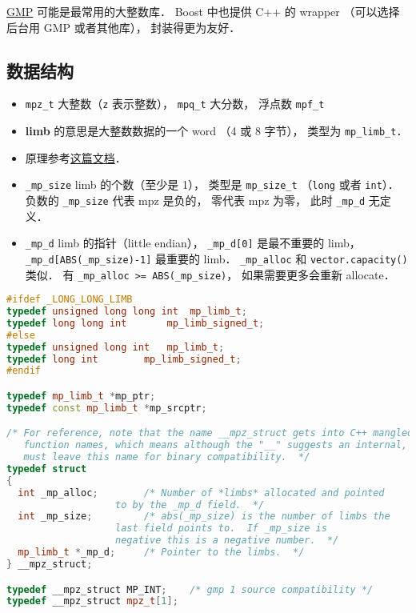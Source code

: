 
\href{https://gmplib.org/}{GMP} 可能是最常用的大整数库． Boost 中也提供 C++ 的 wrapper （可以选择后台用 GMP 或者其他库）， 封装得更为友好．

\subsection{数据结构}
\begin{itemize}
\item \verb|mpz_t| 大整数（\verb|z| 表示整数）， \verb|mpq_t| 大分数， 浮点数 \verb|mpf_t|
\item \textbf{limb} 的意思是大整数数据的一个 word （4 或 8 字节）， 类型为 \verb|mp_limb_t|．
\item 原理参考\href{https://gmplib.org/manual/Integer-Internals#Integer-Internals}{这篇文档}．
\item \verb|_mp_size| limb 的个数（至少是 1）， 类型是 \verb|mp_size_t| （\verb|long| 或者 \verb|int|）． 负数的 \verb|_mp_size| 代表 mpz 是负的， 零代表 mpz 为零， 此时 \verb|_mp_d| 无定义．
\item \verb|_mp_d| limb 的指针（little endian）， \verb|_mp_d[0]| 是最不重要的 limb， \verb|_mp_d[ABS(_mp_size)-1]| 最重要的 limb．
\verb|_mp_alloc| 和 \verb|vector.capacity()| 类似． 有 \verb|_mp_alloc >= ABS(_mp_size)|， 如果需要更多会重新 allocate．
\end{itemize}

\begin{lstlisting}[language=cpp]
#ifdef _LONG_LONG_LIMB
typedef unsigned long long int	mp_limb_t;
typedef long long int		mp_limb_signed_t;
#else
typedef unsigned long int	mp_limb_t;
typedef long int		mp_limb_signed_t;
#endif

typedef mp_limb_t *mp_ptr;
typedef const mp_limb_t *mp_srcptr;

/* For reference, note that the name __mpz_struct gets into C++ mangled
   function names, which means although the "__" suggests an internal, we
   must leave this name for binary compatibility.  */
typedef struct
{
  int _mp_alloc;		/* Number of *limbs* allocated and pointed
				   to by the _mp_d field.  */
  int _mp_size;			/* abs(_mp_size) is the number of limbs the
				   last field points to.  If _mp_size is
				   negative this is a negative number.  */
  mp_limb_t *_mp_d;		/* Pointer to the limbs.  */
} __mpz_struct;

typedef __mpz_struct MP_INT;    /* gmp 1 source compatibility */
typedef __mpz_struct mpz_t[1];
\end{lstlisting}
